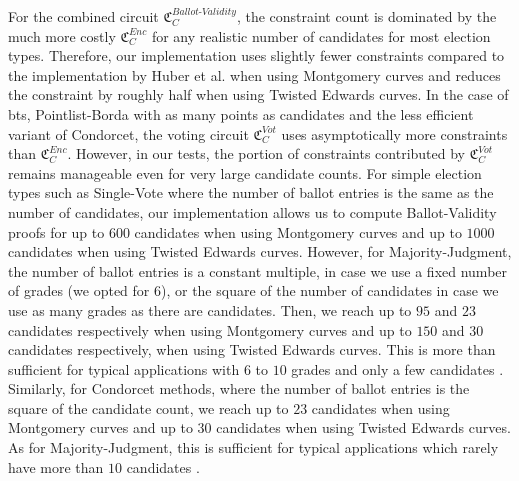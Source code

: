 For the combined circuit $\mathfrak{C}_C^{Ballot\text{-}Validity}$, the constraint count is dominated by the much more costly $\mathfrak{C}_C^{Enc}$ for any realistic number of candidates for most election types.
Therefore, our implementation uses slightly fewer constraints compared to the implementation by Huber et al. when using Montgomery curves and reduces the constraint by roughly half when using Twisted Edwards curves.
In the case of \gls{bts}, Pointlist-Borda with as many points as candidates and the less efficient variant of Condorcet, the voting circuit $\mathfrak{C}_C^{Vot}$ uses asymptotically more constraints than $\mathfrak{C}_C^{Enc}$.
However, in our tests, the portion of constraints contributed by $\mathfrak{C}_C^{Vot}$ remains manageable even for very large candidate counts.
For simple election types such as Single-Vote where the number of ballot entries is the same as the number of candidates, our implementation allows us to compute Ballot-Validity proofs for up to $600$ candidates when using Montgomery curves and up to $1000$ candidates when using Twisted Edwards curves.
However, for Majority-Judgment, the number of ballot entries is a constant multiple, in case we use a fixed number of grades (we opted for $6$), or the square of the number of candidates in case we use as many grades as there are candidates.
Then, we reach up to $95$ and $23$ candidates respectively when using Montgomery curves and up to $150$ and $30$ candidates respectively, when using Twisted Edwards curves.
This is more than sufficient for typical applications with $6$ to $10$ grades and only a few candidates \cite{balinski_election_2011}.
Similarly, for Condorcet methods, where the number of ballot entries is the square of the candidate count, we reach up to $23$ candidates when using Montgomery curves and up to $30$ candidates when using Twisted Edwards curves.
As for Majority-Judgment, this is sufficient for typical applications which rarely have more than $10$ candidates \cite{huber_zk-snarks_2025}.

